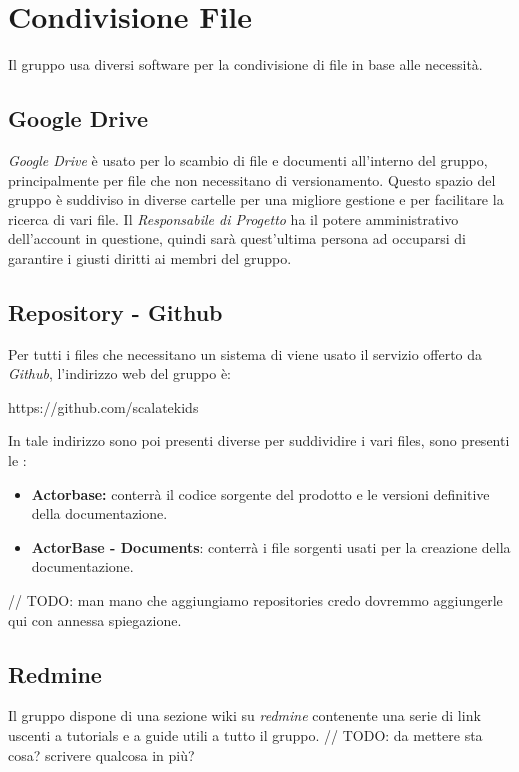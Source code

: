 \section{Condivisione File}
Il gruppo usa diversi software per la condivisione di file in base alle necessità.

\subsection{Google Drive}
\textit{Google Drive} è usato per lo scambio di file e documenti all'interno del gruppo, principalmente per file che non necessitano di versionamento.
Questo spazio del gruppo è suddiviso in diverse cartelle per una migliore gestione e per facilitare la ricerca di vari file.
Il \textit{Responsabile di Progetto} ha il potere amministrativo dell'account in questione, quindi sarà quest'ultima persona ad occuparsi di garantire i giusti diritti ai membri del gruppo.

\subsection{Repository - Github}
Per tutti i files che necessitano un sistema di  viene usato il servizio offerto da \textit{Github}, l'indirizzo web del gruppo è:
\begin{center}
https://github.com/scalatekids
\end{center}

In tale indirizzo sono poi presenti diverse  per suddividire i vari files, sono presenti le :
\begin{itemize}
  \item \textbf{Actorbase:} conterrà il codice sorgente del prodotto e le versioni definitive della documentazione.
  \item \textbf{ActorBase - Documents}: conterrà i file sorgenti usati per la creazione della documentazione.
\end{itemize}
	// TODO: man mano che aggiungiamo repositories credo dovremmo aggiungerle qui con annessa spiegazione.

\subsection{Redmine}
Il gruppo dispone di una sezione wiki su \textit{redmine} contenente una serie di link uscenti a tutorials e a guide utili a tutto il gruppo.
// TODO: da mettere sta cosa? scrivere qualcosa in più?
